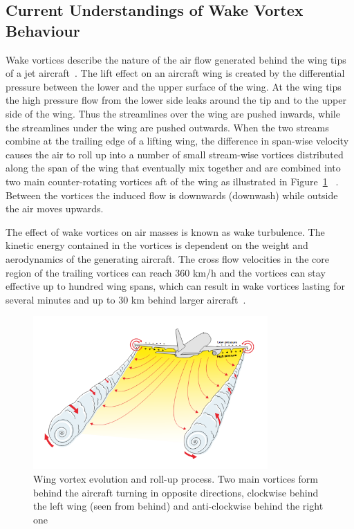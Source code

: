 \subsection{Current Understandings of Wake Vortex Behaviour}
Wake vortices describe the nature of the air flow generated behind the wing tips of a jet aircraft~\cite{doc4444full}.
The lift effect on an aircraft wing is created by the differential pressure between the lower and the upper surface of the wing. 
At the wing tips the high pressure flow from the lower side leaks around the tip and to the upper side of the wing. Thus the streamlines over the wing are pushed inwards, while the streamlines under the wing are pushed outwards. When the two streams combine at the trailing edge of a lifting wing, the difference in span-wise velocity causes the air to roll up into a number of small stream-wise vortices distributed along the span of the wing that eventually mix together and are combined into two main counter-rotating vortices aft of the wing as illustrated in Figure~\ref{fig:vortex_develop} ~\cite{houghton2012aerodynamics,magazine_aibus_safety, Breitsamter2011Feb, gerz_commercial_2002}. Between the vortices the induced flow is downwards (downwash) while outside the air moves upwards.

The effect of wake vortices on air masses is known as wake turbulence. 
The kinetic energy contained in the vortices is dependent on the weight and aerodynamics of the generating aircraft. The cross flow velocities in the core region of the trailing vortices can reach $360$ km/h and the vortices can stay effective up to hundred wing spans, which can result in wake vortices lasting for several minutes and up to $30$ km behind larger aircraft~\cite{Breitsamter2011Feb, gerz_commercial_2002}. 
\begin{figure}[h]
    \centering
    \includegraphics[width=0.8\textwidth]{graphics/WakeVortexPlane.png}
    \caption[Wake vortex roll-up process]{Wing vortex evolution and roll-up process. Two main vortices form behind the aircraft turning in opposite directions, clockwise behind the left wing (seen from behind) and anti-clockwise behind the right one~\cite[p.~043]{magazine_aibus_safety}} \label{fig:vortex_develop}
\end{figure}

